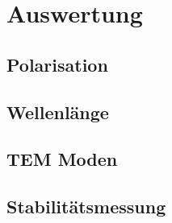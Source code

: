 \section{Auswertung}
\subsection{Polarisation}
\subsection{Wellenlänge}
\subsection{TEM Moden}
\subsection{Stabilitätsmessung}
